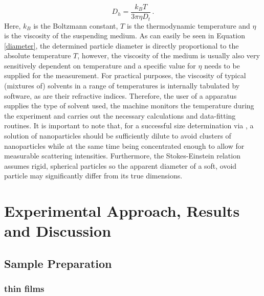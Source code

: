 \begin{equation}
\label{diameter}
	D_h = \frac{k_B T}{3\pi \eta D_t} \, .
\end{equation}
Here, $k_B$ is the Boltzmann constant, $T$ is the thermodynamic temperature and $\eta$ is the viscosity of the suspending medium. As can easily be seen in Equation \eqref{diameter}, the determined particle diameter is directly proportional to the absolute temperature $T$, however, the viscosity of the medium is usually also very sensitively dependent on temperature and a specific value for $\eta$ needs to be supplied for the measurement. For practical purposes, the viscosity of typical (mixtures of) solvents in a range of temperatures is internally tabulated by software, as are their refractive indices. Therefore, the user of a \dls{} apparatus supplies the type of solvent used, the machine monitors the temperature during the experiment and carries out the necessary calculations and data-fitting routines. It is important to note that, for a successful size determination via \dls{}, a solution of nanoparticles should be sufficiently dilute to avoid clusters of nanoparticles while at the same time being concentrated enough to allow for measurable scattering intensities. Furthermore, the Stokes-Einstein relation assumes rigid, spherical particles so the apparent diameter of a soft, ovoid particle may significantly differ from its true dimensions.

\section{Experimental Approach, Results and Discussion}
\label{sec:expwork}
\subsection{Sample Preparation}
\subsubsection{\sih{}}
\subsubsection{\pvtr{} thin films}
